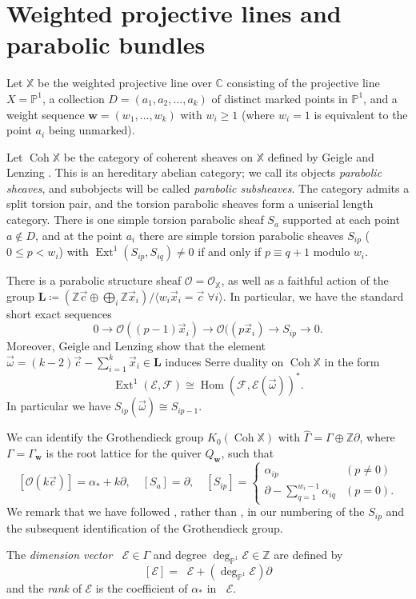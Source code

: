 \documentclass[12pt,a4paper]{amsart}
\theoremstyle{plain}
\newcommand{\C}{\mathbb C}
\newcommand{\Z}{\mathbb Z}
\newcommand{\PP}{\mathbb P}
\DeclareMathOperator{\Coh}{Coh}
\DeclareMathOperator{\Hom}{Hom}
\DeclareMathOperator{\Ext}{Ext}
\DeclareMathOperator{\dimv}{\underline\dim}
\newcommand{\OO}{\mathcal O}
\newcommand{\F}{\mathcal F}
\newcommand{\E}{\mathcal E}
\newcommand{\XX}{\mathbb X}
\newcommand{\ox}{\vec x}
\newcommand{\oc}{\vec c}
\newcommand{\oom}{\vec{\omega}}
\newcommand{\bw}{\mathbf w}
\begin{document}
\section{Weighted projective lines and parabolic bundles}


Let $\XX$ be the weighted projective line over $\C$ consisting of the projective line $X=\PP^1$, 
a collection $D = (a_1,a_2,\dots,a_k)$ of distinct marked points in $\PP^1$,
and a weight sequence $\bw=(w_1,\dots,w_k)$ with $w_i\ge 1$
(where $w_i=1$ is equivalent to the point $a_i$ being unmarked).


Let $\Coh\XX$ be the category of coherent sheaves on $\XX$ defined by Geigle and Lenzing \cite{GL}. This is an hereditary abelian category; we call its objects \emph{parabolic sheaves}, and subobjects will be called \emph{parabolic subsheaves}. The category admits a split torsion pair, and the torsion parabolic sheaves form a uniserial length category. There is one simple torsion parabolic sheaf $S_a$ supported at each point $a\notin D$, and at the point $a_i$ there are simple torsion parabolic sheaves $S_{ip}$ ($0\le p < w_i$) with $\Ext^1(S_{ip},S_{iq})\neq0$ if and only if $p\equiv q+1$ modulo $w_i$.

There is a parabolic structure sheaf $\OO=\OO_\XX$, as well as a faithful action of the group $\mathbf L\coloneqq(\Z\oc\oplus\bigoplus_i\Z\ox_i)/\langle w_i\ox_i=\oc\;\forall i\rangle$. In particular, we have the standard short exact sequences
\[ 0\to \OO((p-1)\ox_i) \to \OO((p\ox_i) \to S_{ip} \to 0. \]
Moreover, Geigle and Lenzing show that the element $\oom = (k-2)\oc - \sum_{i=1}^k \ox_i \in \mathbf L$ induces Serre duality on $\Coh\XX$ in the form
\[ \Ext^1(\E,\F) \cong \Hom(\F,\E(\oom))^*. \]
In particular we have $S_{ip}(\oom)\cong S_{ip-1}$.

We can identify the Grothendieck group $K_0(\Coh\XX)$ with $\hat{\Gamma}=\Gamma\oplus\Z \partial$, where $\Gamma = \Gamma_\bw$ is the root lattice for the quiver $Q_\bw$, such that
\[ [\OO(k\oc)] = \alpha_* + k\partial, \quad [S_a] = \partial, \quad
[S_{ip}] = \begin{cases} \alpha_{ip} & (p\neq 0) \\
\partial - \sum_{q=1}^{w_i-1} \alpha_{iq} & (p=0). \end{cases} \]
We remark that we have followed \cite{Schiffmann}, rather than \cite{GL}, in our numbering of the $S_{ip}$ and the subsequent identification of the Grothendieck group.

The \emph{dimension vector} $\dimv \E\in \Gamma$ and degree $\deg_{\PP^1}\E \in\Z$ are defined by 
\[
[\E]=\dimv \E + (\deg_{\PP^1} \E)\partial
\]
and the \emph{rank} of $\E$ is the coefficient of $\alpha_\ast$ in $\dimv\E$.
\end{document}
